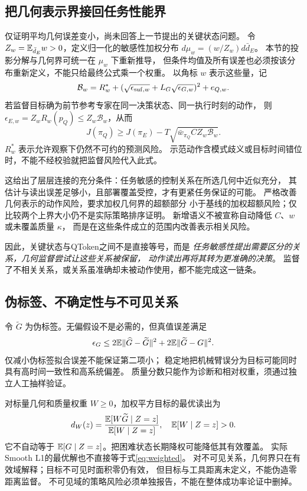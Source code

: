 \subsection{把几何表示界接回任务性能界}
仅证明平均几何误差变小，尚未回答上一节提出的关键状态问题。
令 $Z_w=\mathbb E_{\bar d_E}w>0$，定义归一化的敏感性加权分布
$d\mu_w=(w/Z_w)d\bar d_E$。
本节的投影分解与几何界可统一在 $\mu_w$ 下重新推导，
但条件均值及所有误差也必须按该分布重新定义，不能只给最终公式乘一个权重。
以角标 $w$ 表示这些量，记
\begin{equation}
 \mathcal B_w=R_w^*+
 (\sqrt{\epsilon_{{\rm suf},w}}+L_G\sqrt{\epsilon_{G,w}})^2+e_{Q,w}.
 \label{eq:weightedrepresentation}
\end{equation}
若监督目标确为前节参考专家在同一决策状态、同一执行时刻的动作，
则 $\epsilon_{E,w}=Z_wR_w(p_Q)\le Z_w\mathcal B_w$，从而
\begin{equation}
 J(\pi_Q)\ge J(\pi_E)-T\sqrt{\bar w_{\pi_Q}C Z_w\mathcal B_w}.
 \label{eq:geometrytotask}
\end{equation}
$R_w^*$ 表示允许观察下仍然不可约的预测风险。
示范动作含模式歧义或目标时间错位时，不能不经校验就把监督风险代入此式。

这给出了层层连接的充分条件：任务敏感的控制关系在所选几何中近似充分，
其估计与读出误差足够小，且部署覆盖受控，才有更紧任务保证的可能。
严格改善几何表示的动作风险，要求加权几何界的超额部分
小于基线的加权超额风险；仅比较两个上界大小仍不是实际策略排序证明。
新增语义不被宣称自动降低 $C$、$w$ 或未覆盖质量 $\kappa$，
而是在这些条件成立的范围内改善表示相关风险。

因此，关键状态与QToken之间不是直接等号，而是
\emph{任务敏感性提出需要区分的关系，几何监督尝试让这些关系被保留，
动作读出再将其转为更准确的决策}。
监督了不相关关系，或关系虽准确却未被动作使用，都不能完成这一链条。

\subsection{伪标签、不确定性与不可见关系}
令 $\widetilde G$ 为伪标签。无偏假设不是必需的，但真值误差满足
\begin{equation}
 \epsilon_G\le
 2\mathbb E\lVert\widehat G-\widetilde G\rVert^2+
 2\mathbb E\lVert\widetilde G-G\rVert^2.
 \label{eq:pseudolabel}
\end{equation}
仅减小伪标签拟合误差不能保证第二项小；
稳定地把机械臂误分为目标可能同时具有高时间一致性和高系统偏差。
质量分数只能作为诊断和相对权重，须通过独立人工抽样验证。

对标量几何和质量权重 $W\ge0$，加权平方目标的最优读出为
\begin{equation}
 d_W(z)=\frac{\mathbb E[W\widetilde G\mid Z=z]}{\mathbb E[W\mid Z=z]},
 \quad \mathbb E[W\mid Z=z]>0.
 \label{eq:weighted}
\end{equation}
它不自动等于 $\mathbb E[G\mid Z=z]$。把困难状态长期降权可能降低其有效覆盖。
实际Smooth L1的最优解也不直接等于式\eqref{eq:weighted}。
对不可见关系，几何界只在有效域解释；目标不可见时面积零仍有效，
但目标与工具距离未定义，不能伪造零距离监督。
不可见域的策略风险必须单独报告，不能在整体成功率论证中删掉。


